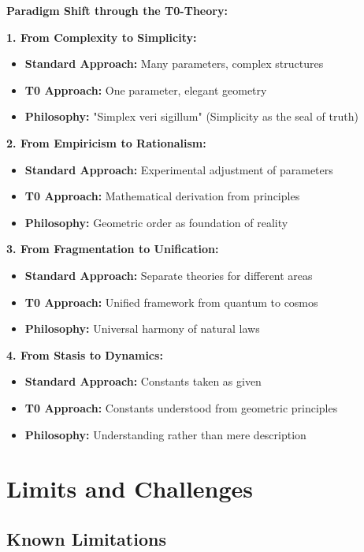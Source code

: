\documentclass[12pt,a4paper]{article}
\begin{document}
	\begin{foundation}
		\textbf{Paradigm Shift through the T0-Theory:}
		
		\textbf{1. From Complexity to Simplicity:}
		\begin{itemize}
			\item \textbf{Standard Approach:} Many parameters, complex structures
			\item \textbf{T0 Approach:} One parameter, elegant geometry
			\item \textbf{Philosophy:} "Simplex veri sigillum" (Simplicity as the seal of truth)
		\end{itemize}
		
		\textbf{2. From Empiricism to Rationalism:}
		\begin{itemize}
			\item \textbf{Standard Approach:} Experimental adjustment of parameters
			\item \textbf{T0 Approach:} Mathematical derivation from principles
			\item \textbf{Philosophy:} Geometric order as foundation of reality
		\end{itemize}
		
		\textbf{3. From Fragmentation to Unification:}
		\begin{itemize}
			\item \textbf{Standard Approach:} Separate theories for different areas
			\item \textbf{T0 Approach:} Unified framework from quantum to cosmos
			\item \textbf{Philosophy:} Universal harmony of natural laws
		\end{itemize}
		
		\textbf{4. From Stasis to Dynamics:}
		\begin{itemize}
			\item \textbf{Standard Approach:} Constants taken as given
			\item \textbf{T0 Approach:} Constants understood from geometric principles
			\item \textbf{Philosophy:} Understanding rather than mere description
		\end{itemize}
	\end{foundation}
	
	\section{Limits and Challenges}
	
	\subsection{Known Limitations}
	
\end{document}
